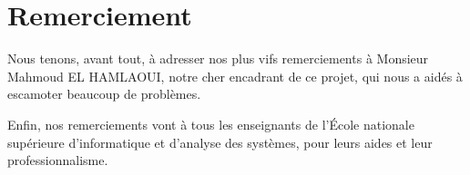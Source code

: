 \chapter*{Remerciement}
\large
\begin{onehalfspace}
\large{	 Nous tenons, avant tout, à adresser nos plus vifs remerciements à Monsieur Mahmoud EL HAMLAOUI, notre cher encadrant de ce projet, qui nous a aidés à escamoter beaucoup de problèmes.
	 
	 Enfin, nos remerciements vont à tous les enseignants de l’École nationale supérieure d'informatique et d'analyse des systèmes, pour leurs aides et leur professionnalisme.}
\end{onehalfspace}